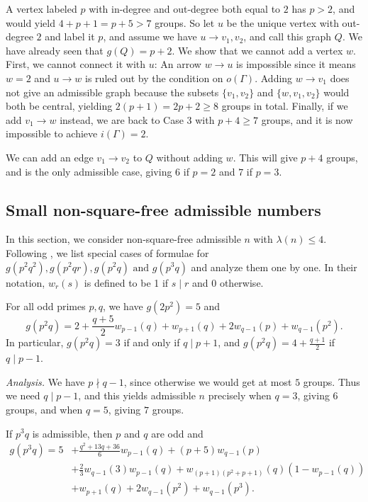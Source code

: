 A vertex labeled $p$ with in-degree and out-degree both equal to $2$ has $p > 2$, and would yield $4 + p + 1 = p + 5 > 7$ groups.
So let $u$ be the unique vertex with out-degree $2$ and label it $p$, and assume we have $u \to v_1, v_2$, and call this graph $Q$.
We have already seen that $g(Q) = p + 2$.
We show that we cannot add a vertex $w$.
First, we cannot connect it with $u$: An arrow $w \to u$ is impossible since it means $w = 2$
 and $u \to w$ is ruled out by the condition on $o(\Gamma)$.
Adding $w \to v_1$ does not give an admissible graph
because the subsets $\{v_1, v_2\}$ and $\{w, v_1, v_2\}$ would both be central, yielding $2(p + 1) = 2p + 2 \ge 8$ groups in total.
Finally, if we add $v_1 \to w$ instead, we are back to Case $3$ with $p + 4 \ge 7$ groups, and it is now impossible to achieve $i(\Gamma) = 2$.

We can add an edge $v_1 \to v_2$ to $Q$ without adding $w$.
This will give $p + 4$ groups, and is the only admissible case, giving $6$ if $p = 2$ and $7$ if $p = 3$.

\subsection{Small non-square-free admissible numbers}
In this section, we consider non-square-free admissible $n$ with $\lambda(n) \le 4$.
Following {\cite{bettinafour1}}, we list special cases of formulae for $g(p^2 q^2), g(p^2 q r), g(p^2 q) \text{ and } g(p^3 q)$ and analyze them one by one.
In their notation, $w_r(s)$ is defined to be 1 if $s \mid r$ and 0 otherwise.


\begin{eufact}
	For all odd primes $p, q$, we have $g(2p^2) = 5$ and \[g(p^2 q) = 2 + \frac{q + 5}{2} w_{p - 1}(q) + w_{p + 1}(q) + 2w_{q - 1}(p) + w_{q - 1}(p^2).\]
	In particular, $g(p^2 q) = 3$ if and only if $q \mid p + 1$, and $g(p^2 q) = 4 + \frac{q + 1}{2}$ if $q \mid p - 1$.
\end{eufact}

\textit{Analysis.} We have $p \nmid q - 1$, since otherwise we would get at most $5$ groups.
Thus we need $q \mid p - 1$, and this yields admissible $n$ precisely when $q = 3$, giving $6$ groups, and when $q = 5$, giving $7$ groups.

\begin{eufact}
	If $p^3 q$ is admissible, then $p$ and $q$ are odd and
	$$\begin{aligned}
		g(p^3 q) = 5 &+ \frac{q^2 + 13q + 36}{6} w_{p - 1}(q) + (p + 5) w_{q - 1}(p) \\
		&+ \frac{2}{3} w_{q - 1}(3)w_{p - 1}(q) + w_{(p + 1)(p^2 + p + 1)}(q) (1 - w_{p - 1}(q)) \\
		&+ w_{p + 1}(q) + 2 w_{q - 1}(p^2) + w_{q - 1}(p^3).
	\end{aligned}$$
\end{eufact}

